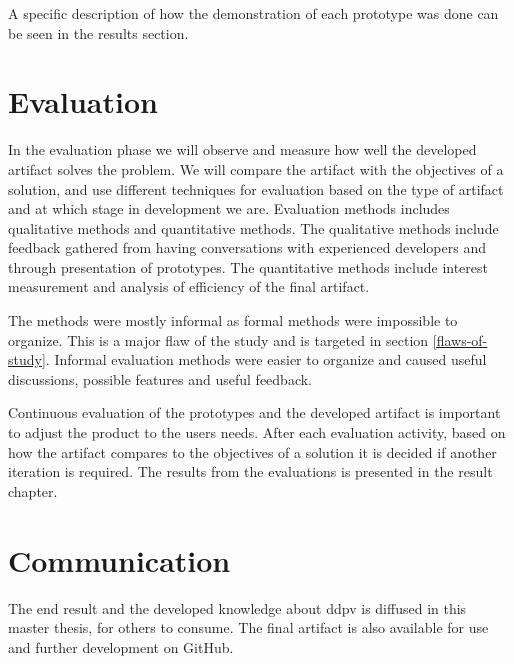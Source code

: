\documentclass{report}
\begin{document}

A specific description of how the demonstration of each prototype was done can be seen in the results section.

 
\section{Evaluation}
In the evaluation phase we will observe and measure how well the developed artifact solves the problem. We will compare the artifact with the objectives of a solution, and use different techniques for evaluation based on the type of artifact and at which stage in development we are. Evaluation methods includes qualitative methods and quantitative methods. The qualitative methods include feedback gathered from having conversations with experienced developers and through presentation of prototypes. The quantitative methods include interest measurement and analysis of efficiency of the final artifact.   

The methods were mostly informal as formal methods were impossible to organize. This is a major flaw of the study and is targeted in section \ref{flaws-of-study}. Informal evaluation methods were easier to organize and caused useful discussions, possible features and useful feedback. 

Continuous evaluation of the prototypes and the developed artifact is important to adjust the product to the users needs. After each evaluation activity, based on how the artifact compares to the objectives of a solution it is decided if another iteration is required. The results from the evaluations is presented in the result chapter.

\section{Communication}
The end result and the developed knowledge about \gls{ddpv} is diffused in this master thesis, for others to consume. The final artifact is also available for use and further development on GitHub\cite{detekt-hint-repository}.
\end{document}
